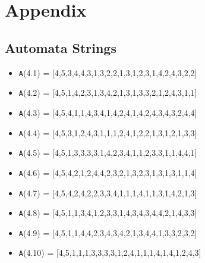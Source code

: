 \documentclass[runningheads,a4paper]{llncs}
\begin{document}
\section{Appendix}

\subsection{Automata Strings}


\begin{itemize}
	\item {\texttt A(4.1) = } [4,5,3,4,4,3,1,3,2,2,1,3,1,2,3,1,4,2,4,3,2,2]
	\item {\texttt A(4.2) = } [4,5,1,4,2,3,1,3,4,2,1,3,1,3,3,2,1,2,4,3,1,1]
	\item {\texttt A(4.3) = } [4,5,4,1,1,4,3,4,1,4,2,4,1,4,2,4,3,4,3,2,4,4]
	\item {\texttt A(4.4) = } [4,5,3,1,2,4,3,1,1,1,2,4,1,2,2,1,3,1,2,1,3,3]
	\item {\texttt A(4.5) = } [4,5,1,3,3,3,3,1,4,2,3,4,1,1,2,3,3,1,1,4,4,1]
	
	\item {\texttt A(4.6) = } [4,5,4,2,1,2,4,4,2,3,2,1,3,2,3,1,3,1,3,1,1,4]
	\item {\texttt A(4.7) = } [4,5,4,2,4,2,2,3,3,4,1,1,1,4,1,1,3,1,4,2,1,3]
	\item {\texttt A(4.8) = } [4,5,1,1,3,4,1,2,3,3,1,4,3,4,3,4,4,2,1,4,3,3]
	\item {\texttt A(4.9) = } [4,5,1,1,4,4,2,3,4,3,4,2,1,3,4,4,1,3,3,2,3,2]
	\item {\texttt A(4.10) = } [4,5,1,1,1,3,3,3,3,1,2,4,1,1,1,4,1,4,1,2,4,3]	
\end{itemize}
\end{document}
